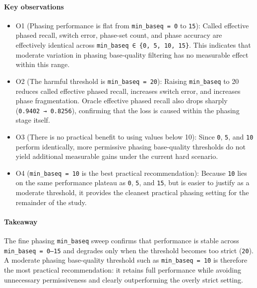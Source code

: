 \documentclass[
]{article}
\begin{document}
\paragraph{Key observations}\label{key-observations-11}

\begin{itemize}
\item
  O1 (Phasing performance is flat from \texttt{min\_baseq\ =\ 0} to
  \texttt{15}): Called effective phased recall, switch error, phase-set
  count, and phase accuracy are effectively identical across
  \texttt{min\_baseq\ ∈\ \{0,\ 5,\ 10,\ 15\}}. This indicates that
  moderate variation in phasing base-quality filtering has no measurable
  effect within this range.
\item
  O2 (The harmful threshold is \texttt{min\_baseq\ =\ 20}): Raising
  \texttt{min\_baseq} to 20 reduces called effective phased recall,
  increases switch error, and increases phase fragmentation. Oracle
  effective phased recall also drops sharply
  (\texttt{0.9402\ →\ 0.8256}), confirming that the loss is caused
  within the phasing stage itself.
\item
  O3 (There is no practical benefit to using values below 10): Since
  \texttt{0}, \texttt{5}, and \texttt{10} perform identically, more
  permissive phasing base-quality thresholds do not yield additional
  measurable gains under the current hard scenario.
\item
  O4 (\texttt{min\_baseq\ =\ 10} is the best practical recommendation):
  Because \texttt{10} lies on the same performance plateau as
  \texttt{0}, \texttt{5}, and \texttt{15}, but is easier to justify as a
  moderate threshold, it provides the cleanest practical phasing setting
  for the remainder of the study.
\end{itemize}

\paragraph{Takeaway}\label{takeaway-11}

The fine phasing \texttt{min\_baseq} sweep confirms that performance is
stable across \texttt{min\_baseq\ =\ 0–15} and degrades only when the
threshold becomes too strict (\texttt{20}). A moderate phasing
base-quality threshold such as \texttt{min\_baseq\ =\ 10} is therefore
the most practical recommendation: it retains full performance while
avoiding unnecessary permissiveness and clearly outperforming the overly
strict setting.
\end{document}
